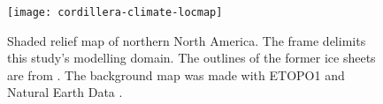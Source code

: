 \begin{figure}[t]
	\vspace*{2mm}
	\begin{center}
		\texttt{[image: cordillera-climate-locmap]}
	\end{center}
	\caption{Shaded relief map of northern North America. The frame delimits this study's modelling domain. The outlines of the former ice sheets are from \citet{kleman-etal-2010}. The background map was made with ETOPO1 \citep{data:etopo1} and Natural Earth Data \citep{data:naturalearth}.}
	\label{fig:locmap}
\end{figure}

